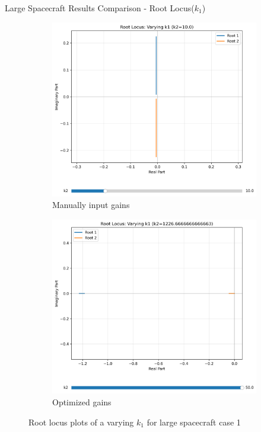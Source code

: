 \documentclass{beamer}
\begin{document}
\begin{frame}{Large Spacecraft Results Comparison - Root Locus($k_1$)}
    \begin{figure}[H]
    \label{Fig. 1}
    \centering
    \begin{subfigure}[b]{0.48\columnwidth}
        \label{Fig. 1.A}
        \centering
        \includegraphics[width=\linewidth]{base_k1__root_locus(1).pdf}
        \caption{Manually input gains}
        \label{fig:subfig1}
    \end{subfigure}
    \hfill
    \begin{subfigure}[b]{0.48\columnwidth}
        \label{Fig. 1.B}
        \centering
        \includegraphics[width=\linewidth]{best_k1_root_locus(1).pdf}
        \caption{Optimized gains}
        \label{fig:subfig2}
    \end{subfigure}
    \caption{Root locus plots of a varying $k_1$ for large spacecraft case 1}
    \label{fig:combined}
\end{figure}
\end{frame}
\end{document}

